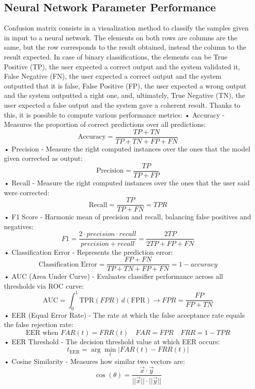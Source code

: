 \subsection{Neural Network Parameter Performance}
Confusion matrix consists in a visualization method to classify the samples given in input to a neural network. The elements on both rows are columns are the same, but the row corresponds to the result obtained, instead the column to the result expected. In case of binary classifications, the elements can be True Positive (TP), the user expected a correct output and the system validated it, False Negative (FN), the user expected a correct output and the system outputted that it is false, False Positive (FP), the user expected a wrong output and the system outputted a right one, and, ultimately, True Negative (TN), the user expected a false output and the system gave a coherent result. Thanks to this, it is possible to compute various performance metrics:\newline
• Accuracy - Measures the proportion of correct predictions over all predictions:\newline 
\[
\text{Accuracy} = \frac{TP + TN}{TP + TN + FP + FN}
\]
• Precision - Measure the right computed instances over the ones that the model given corrected as output:\newline
\[
\text{Precision}=\frac{TP}{TP+FP}
\]
• Recall - Measure the right computed instances over the ones that the user said were corrected:\newline
\[
\text{Recall}=\frac{TP}{TP+FN}=TPR
\]
• F1 Score - Harmonic mean of precision and recall, balancing false positives and negatives:\newline 
\[
F1 = \frac{2\cdot precision\cdot recall}{precision+recall}=\frac{2TP}{2TP + FP + FN}
\]
• Classification Error - Represents the prediction error:\newline
\[
\text{Classification Error} = \frac{FP + FN}{TP + TN + FP + FN}=1-accuracy
\]
• AUC (Area Under Curve) - Evaluates classifier performance across all thresholds via ROC curve: \newline 
\[
\text{AUC} = \int_{0}^{1} \text{TPR}(FPR) \, d(\text{FPR})\rightarrow FPR=\frac{FP}{FP+TN}
\]
• EER (Equal Error Rate) - The rate at which the false acceptance rate equals the false rejection rate:\newline
\[
\text{EER} \text{ when } FAR(t) = FRR(t)\,\,\,\,\,\,FAR=FPR\,\,\,\,\,\,FRR=1-TPR
\]
• EER Threshold - The decision threshold value at which EER occurs:\newline
\[
t_{\text{EER}} = \arg\min_t |FAR(t) - FRR(t)|
\]
• Cosine Similarity - Measures how similar two vectors are:\newline
\[
\cos(\theta) = \frac{\vec{x} \cdot \vec{y}}{||\vec{x}|| \cdot ||\vec{y}||}
\]

